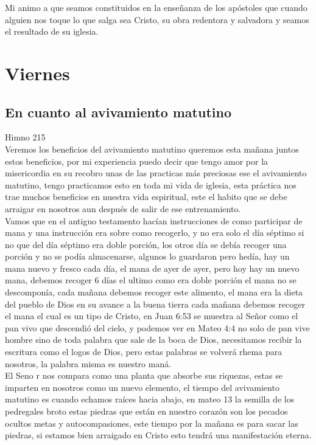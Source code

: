 \documentclass[12pt]{article}
\begin{document}
Mi animo a que seamos constituidos en la enseñanza de los apóstoles que cuando alguien nos toque lo que salga sea Cristo, su obra redentora y salvadora y seamos el resultado de su iglesia.\\

\section*{Viernes}

\subsection*{En cuanto al avivamiento matutino}

Himno 215\\

Veremos los beneficios del avivamiento matutino queremos esta mañana juntos estos beneficios, por mi experiencia puedo decir que tengo amor por la misericordia en su recobro unas de las practicas más preciosas ese el avivamiento matutino, tengo practicamos esto en toda mi vida de iglesia, esta práctica nos trae muchos beneficios en nuestra vida espiritual, este el habito que se debe arraigar en nosotros aun después de salir de ese entrenamiento.\\

Vamos que en el antiguo testamento hacían instrucciones de como participar de mana y una instrucción era sobre como recogerlo, y no era solo el día séptimo si no que del día séptimo era doble porción, los otros día se debía recoger una porción y no se podía almacenarse, algunos lo guardaron pero hedía, hay un mana nuevo y fresco cada día, el mana de ayer de ayer, pero hoy hay un nuevo mana, debemos recoger 6 días el ultimo como era doble porción el mana no se descomponía, cada mañana debemos recoger este alimento, el mana era la dieta del pueblo de Dios en su avance a la buena tierra cada mañana debemos recoger el mana el cual es un tipo de Cristo, en Juan 6:53 se muestra al Señor como el pan vivo que descendió del cielo, y podemos ver en Mateo 4:4 no solo de pan vive hombre sino de toda palabra que sale de la boca de Dios, necesitamos recibir la escritura como el logos de Dios, pero estas palabras se volverá rhema para nosotros, la palabra misma es nuestro maná.\\
 
El Seno r nos compara como una planta que absorbe sus riquezas, estas se imparten en nosotros como un nuevo elemento, el tiempo del avivamiento matutino es cuando echamos raíces hacia abajo, en mateo 13 la semilla de los pedregales broto estas piedras que están en nuestro corazón son los pecados ocultos metas y autocompasiones, este tiempo por la mañana es para sacar las piedras, si estamos bien arraigado en Cristo esto tendrá una manifestación eterna.\\
\end{document}
